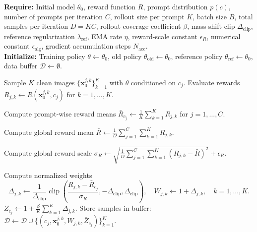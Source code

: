 \documentclass{article} %
\begin{document}
\begin{algorithm}[H]
    \caption{Reinforced Flow Matching}
    \label{alg:velocity-add-delete}
    \textbf{Require:} Initial model $\theta_0$, reward function $R$, prompt distribution $p(c)$, number of prompts per iteration $C$, rollout size per prompt $K$, batch size $B$, total samples per iteration $D = KC$, rollout coverage coefficient $\beta$, mass-shift clip $\Delta_{\mathrm{clip}}$, reference regularization $\lambda_{\mathrm{ref}}$, EMA rate $\eta$, reward-scale constant $\epsilon_R$, numerical constant $\epsilon_{\mathrm{alg}}$, gradient accumulation steps $N_{\mathrm{acc}}$.\\
    \textbf{Initialize:} Training policy $\theta \leftarrow \theta_0$, old policy $\theta_{\mathrm{old}} \leftarrow \theta_0$, reference policy $\theta_{\mathrm{ref}} \leftarrow \theta_0$, data buffer $\mathcal{D} \leftarrow \emptyset$.
    \begin{algorithmic}[1]
             
                \State Sample $K$ clean images $\{\mathbf{x}_0^{j,k}\}_{k=1}^{K}$ with $\theta$ conditioned on $c_j$.
                \State Evaluate rewards $R_{j,k} \leftarrow R(\mathbf{x}_0^{j,k}, c_j)$ for $k = 1, \dots, K$.
            \EndFor

            \State Compute prompt-wise reward means
            $\bar{R}_{c_j} \leftarrow \frac{1}{K}\sum_{k=1}^{K} R_{j,k}$ for $j = 1, \dots, C$.

            \State Compute global reward mean
            $\bar{R} \leftarrow \frac{1}{D}\sum_{j=1}^{C}\sum_{k=1}^{K} R_{j,k}$.

            \State Compute global reward scale
            $\sigma_R \leftarrow \sqrt{\frac{1}{D}\sum_{j=1}^{C}\sum_{k=1}^{K}(R_{j,k} - \bar{R})^2} + \epsilon_R$.

                \State Compute normalized weights
                \[
                    \Delta_{j,k} \leftarrow \frac{1}{\Delta_{\mathrm{clip}}}
                    \operatorname{clip}\!\left(
                        \frac{R_{j,k} - \bar{R}_{c_j}}{\sigma_R},
                        -\Delta_{\mathrm{clip}},
                        \Delta_{\mathrm{clip}}
                    \right),
                    \quad
                    W_{j,k} \leftarrow 1 + \Delta_{j,k},
                    \quad k = 1, \dots, K.
                \]
                \State $\bar{Z}_{c_j} \leftarrow 1 + \frac{\beta}{K}\sum_{k=1}^{K}\Delta_{j,k}$.
                \State Store samples in buffer:
                $\mathcal{D} \leftarrow \mathcal{D} \cup \{(c_j, \mathbf{x}_0^{j,k}, W_{j,k}, \bar{Z}_{c_j})\}_{k=1}^{K}$.
            \EndFor


\end{algorithmic}
\end{algorithm}
\end{document}
